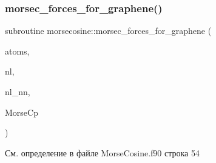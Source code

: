\subsubsection{\texorpdfstring{morsec\+\_\+forces\+\_\+for\+\_\+graphene()}{morsec\_forces\_for\_graphene()}}
{\footnotesize\ttfamily subroutine morsecosine\+::morsec\+\_\+forces\+\_\+for\+\_\+graphene (\begin{DoxyParamCaption}\item[{type(\mbox{\hyperlink{structmd__general_1_1particles}{particles}})}]{atoms,  }\item[{type(\mbox{\hyperlink{structmd__general_1_1neighbour__list}{neighbour\+\_\+list}})}]{nl,  }\item[{type(\mbox{\hyperlink{structmd__general_1_1neighbour__list}{neighbour\+\_\+list}})}]{nl\+\_\+nn,  }\item[{type(\mbox{\hyperlink{structmorsecosine_1_1morsecosine__parameters}{morsecosine\+\_\+parameters}})}]{Morse\+Cp }\end{DoxyParamCaption})}



См. определение в файле Morse\+Cosine.\+f90 строка 54


